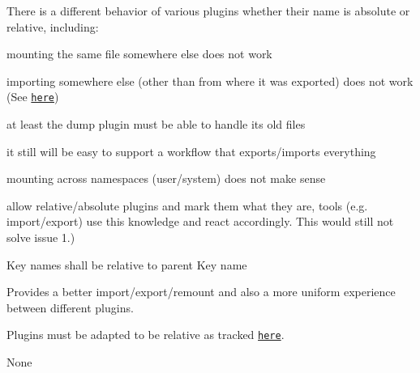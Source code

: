 There is a different behavior of various plugins whether their name is absolute or relative, including\+:


\begin{DoxyEnumerate}
\item mounting the same file somewhere else does not work
\item importing somewhere else (other than from where it was exported) does not work (See \href{https://github.com/ElektraInitiative/libelektra/issues/51}{\tt here})
\end{DoxyEnumerate}


\begin{DoxyItemize}
\item at least the dump plugin must be able to handle its old files
\end{DoxyItemize}


\begin{DoxyItemize}
\item it still will be easy to support a workflow that exports/imports everything
\item mounting across namespaces (user/system) does not make sense
\end{DoxyItemize}


\begin{DoxyItemize}
\item allow relative/absolute plugins and mark them what they are, tools (e.\+g. import/export) use this knowledge and react accordingly. This would still not solve issue 1.)
\end{DoxyItemize}

Key names shall be relative to parent Key name

Provides a better import/export/remount and also a more uniform experience between different plugins.

Plugins must be adapted to be relative as tracked \href{https://github.com/ElektraInitiative/libelektra/issues/51}{\tt here}.

None